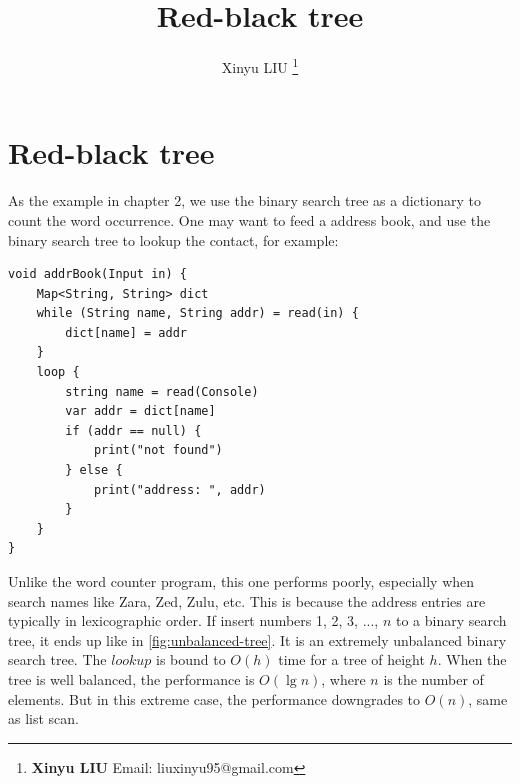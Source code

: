 \documentclass[b5paper]{article}
\begin{document}
\title{Red-black tree}

\author{Xinyu LIU
\thanks{{\bfseries Xinyu LIU} \newline
  Email: liuxinyu95@gmail.com \newline}
  }

\maketitle
\fi


\ifx\wholebook\relax
\chapter{Red-black tree}
\fi

As the example in chapter 2, we use the binary search tree as a dictionary to count the word occurrence. One may want to feed a address book, and use the binary search tree to lookup the contact, for example:

\lstset{frame = single}
\begin{lstlisting}[language=Bourbaki]
void addrBook(Input in) {
    Map<String, String> dict
    while (String name, String addr) = read(in) {
        dict[name] = addr
    }
    loop {
        string name = read(Console)
        var addr = dict[name]
        if (addr == null) {
            print("not found")
        } else {
            print("address: ", addr)
        }
    }
}
\end{lstlisting}

Unlike the word counter program, this one performs poorly, especially when search names like Zara, Zed, Zulu, etc. This is because the address entries are typically in lexicographic order. If insert numbers 1, 2, 3, ..., $n$ to a binary search tree, it ends up like in \cref{fig:unbalanced-tree}. It is an extremely unbalanced binary search tree. The $lookup$ is bound to $O(h)$ time for a tree of height $h$. When the tree is well balanced, the performance is $O(\lg n)$, where $n$ is the number of elements. But in this extreme case, the performance downgrades to $O(n)$, same as list scan.
\end{document}
